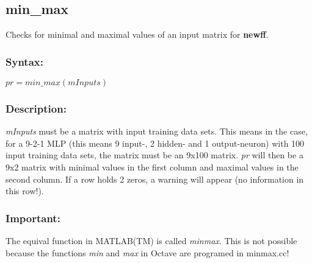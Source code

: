 \subsection{min\_max}
Checks for minimal and maximal values of an input matrix for \textbf{newff}.\\

\subsubsection{Syntax:}

$pr = min\_max(mInputs)$\\

\subsubsection{Description:}
\textit{mInputs} must be a matrix with input training data sets. This means in the case, for a 9-2-1 MLP
(this means 9 input-, 2 hidden- and 1 output-neuron) with 100 input training data sets, the matrix must be
an 9x100 matrix. \textit{pr} will then be a 9x2 matrix with minimal values in the first column and maximal values in the second column. If a row holds 2 zeros, a warning will appear (no information in this row!).

\subsubsection{Important:}
The equival function in MATLAB(TM) is called \textit{minmax}. This is not possible because the functions \textit{min} and \textit{max} in Octave are programed in minmax.cc!